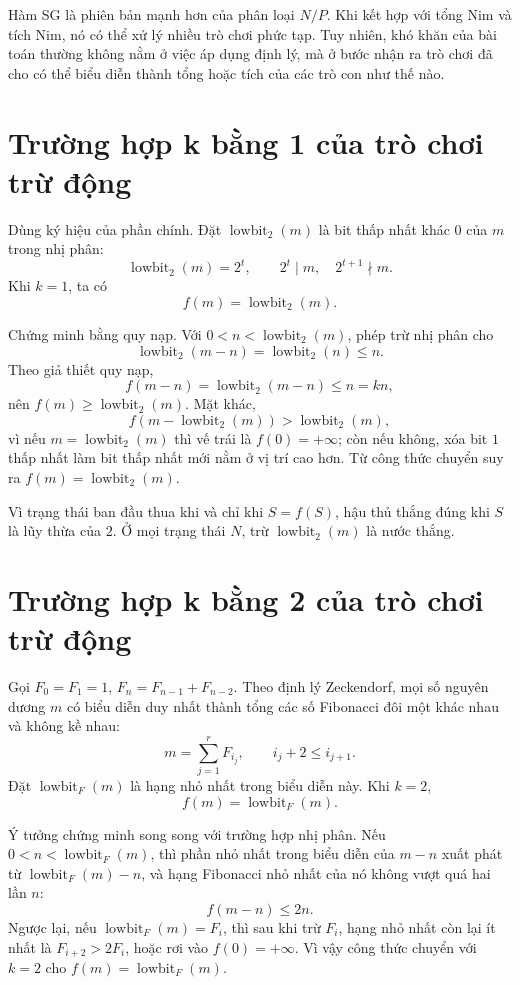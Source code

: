 \documentclass[11pt]{article}
\newcommand{\lowbit}{\operatorname{lowbit}}
\newcommand{\lowbitF}{\operatorname{lowbit}_{F}}
\begin{document}
Hàm SG là phiên bản mạnh hơn của phân loại \(N/P\). Khi kết hợp với tổng Nim
và tích Nim, nó có thể xử lý nhiều trò chơi phức tạp. Tuy nhiên, khó khăn của
bài toán thường không nằm ở việc áp dụng định lý, mà ở bước nhận ra trò chơi
đã cho có thể biểu diễn thành tổng hoặc tích của các trò con như thế nào.

\appendix

\section{Trường hợp k bằng 1 của trò chơi trừ động}

Dùng ký hiệu của phần chính. Đặt \(\lowbit_2(m)\) là bit thấp nhất khác \(0\)
của \(m\) trong nhị phân:
\[
  \lowbit_2(m)=2^t,\qquad 2^t\mid m,\quad 2^{t+1}\nmid m.
\]
Khi \(k=1\), ta có
\[
  f(m)=\lowbit_2(m).
\]

Chứng minh bằng quy nạp. Với \(0<n<\lowbit_2(m)\), phép trừ nhị phân cho
\[
  \lowbit_2(m-n)=\lowbit_2(n)\le n.
\]
Theo giả thiết quy nạp,
\[
  f(m-n)=\lowbit_2(m-n)\le n=kn,
\]
nên \(f(m)\ge \lowbit_2(m)\). Mặt khác,
\[
  f(m-\lowbit_2(m))>\lowbit_2(m),
\]
vì nếu \(m=\lowbit_2(m)\) thì vế trái là \(f(0)=+\infty\); còn nếu không, xóa
bit \(1\) thấp nhất làm bit thấp nhất mới nằm ở vị trí cao hơn. Từ công thức
chuyển suy ra \(f(m)=\lowbit_2(m)\).

Vì trạng thái ban đầu thua khi và chỉ khi \(S=f(S)\), hậu thủ thắng đúng khi
\(S\) là lũy thừa của \(2\). Ở mọi trạng thái \(N\), trừ \(\lowbit_2(m)\) là
nước thắng.

\section{Trường hợp k bằng 2 của trò chơi trừ động}

Gọi \(F_0=F_1=1\), \(F_n=F_{n-1}+F_{n-2}\). Theo định lý Zeckendorf, mọi số
nguyên dương \(m\) có biểu diễn duy nhất thành tổng các số Fibonacci đôi một
khác nhau và không kề nhau:
\[
  m=\sum_{j=1}^r F_{i_j},\qquad i_j+2\le i_{j+1}.
\]
Đặt \(\lowbitF(m)\) là hạng nhỏ nhất trong biểu diễn này. Khi \(k=2\),
\[
  f(m)=\lowbitF(m).
\]

Ý tưởng chứng minh song song với trường hợp nhị phân. Nếu
\(0<n<\lowbitF(m)\), thì phần nhỏ nhất trong biểu diễn của \(m-n\) xuất phát
từ \(\lowbitF(m)-n\), và hạng Fibonacci nhỏ nhất của nó không vượt quá hai lần
\(n\):
\[
  f(m-n)\le 2n.
\]
Ngược lại, nếu \(\lowbitF(m)=F_i\), thì sau khi trừ \(F_i\), hạng nhỏ nhất còn
lại ít nhất là \(F_{i+2}>2F_i\), hoặc rơi vào \(f(0)=+\infty\). Vì vậy công
thức chuyển với \(k=2\) cho \(f(m)=\lowbitF(m)\).
\end{document}
